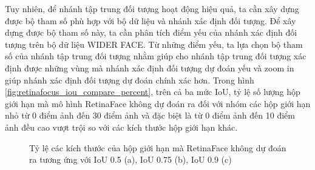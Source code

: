 {    \noindent
    Tuy nhiên, để nhánh tập trung đối tượng hoạt động hiệu quả, ta cần xây dựng được bộ tham số phù hợp với bộ dữ liệu và nhánh xác định đối tượng.
    Để xây dựng được bộ tham số này, ta cần phân tích điểm yếu của nhánh xác định đối tượng trên bộ dữ liệu WIDER FACE.
    Từ những điểm yếu, ta lựa chọn bộ tham số của nhánh tập trung đối tượng nhằm giúp cho nhánh tập trung đối tượng xác định được những vùng mà nhánh xác định đối tượng dự đoán yếu và zoom in giúp nhánh xác định đối tượng dự đoán chính xác hơn.
    Trong hình \ref{fig:retinafocus_iou_compare_percent}, trên cả ba mức IoU, tỷ lệ số lượng hộp giới hạn mà mô hình RetinaFace không dự đoán ra đối với nhóm các hộp giới hạn nhỏ từ 0 điểm ảnh đến 30 điểm ảnh và đặc biệt là từ 0 điểm ảnh đến 10 điểm ảnh đều cao vượt trội so với các kích thước hộp giới hạn khác.

    \begin{figure}[H]
        \centering
        \caption{Tỷ lệ các kích thước của hộp giới hạn mà RetinaFace không dự đoán ra tương ứng với IoU 0.5 (a), IoU 0.75 (b), IoU 0.9 (c)}
        \label{fig:retinafocus_iou_lower}
    \end{figure}

}
